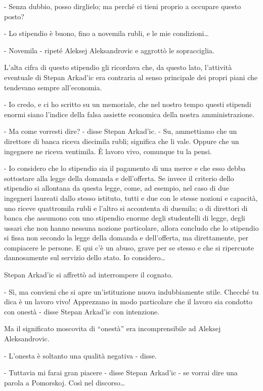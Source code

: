 - Senza dubbio, posso dirglielo; ma perché ci tieni proprio a occupare questo posto? 

- Lo stipendio è buono, fino a novemila rubli, e le mie condizioni\ldots{} 

- Novemila - ripeté Aleksej Aleksandrovic e aggrottò le sopracciglia. 

L'alta cifra di questo stipendio gli ricordava che, da questo lato, l'attività eventuale di Stepan Arkad'ic era contraria al senso principale dei propri piani che tendevano sempre all'economia. 

- Io credo, e ci ho scritto su un memoriale, che nel nostro tempo questi stipendi enormi siano l'indice della falsa assiette economica della nostra amministrazione. 

- Ma come vorresti dire? - disse Stepan Arkad'ic. - Su, ammettiamo che un direttore di banca riceva diecimila rubli; significa che li vale. Oppure che un ingegnere ne riceva ventimila. È lavoro vivo, comunque tu la pensi. 

- Io considero che lo stipendio sia il pagamento di una merce e che esso debba sottostare alla legge della domanda e dell'offerta. Se invece il criterio dello stipendio si allontana da questa legge, come, ad esempio, nel caso di due ingegneri laureati dallo stesso istituto, tutti e due con le stesse nozioni e capacità, uno riceve quattromila rubli e l'altro si accontenta di duemila; o di direttori di banca che assumono con uno stipendio enorme degli studentelli di legge, degli ussari che non hanno nessuna nozione particolare, allora concludo che lo stipendio si fissa non secondo la legge della domanda e dell'offerta, ma direttamente, per compiacere le persone. E qui c'è un abuso, grave per se stesso e che si ripercuote dannosamente sul servizio dello stato. Io considero\ldots{} 

Stepan Arkad'ic si affrettò ad interrompere il cognato. 

- Sì, ma convieni che si apre un'istituzione nuova indubbiamente utile. Checché tu dica è un lavoro vivo! Apprezzano in modo particolare che il lavoro sia condotto con onestà - disse Stepan Arkad'ic con intenzione. 

Ma il significato moscovita di ``onestà'' era incomprensibile ad Aleksej Aleksandrovic. 

- L'onesta è soltanto una qualità negativa - disse. 

- Tuttavia mi farai gran piacere - disse Stepan Arkad'ic - se vorrai dire una parola a Pomorskoj. Così nel discorso\ldots{} 

